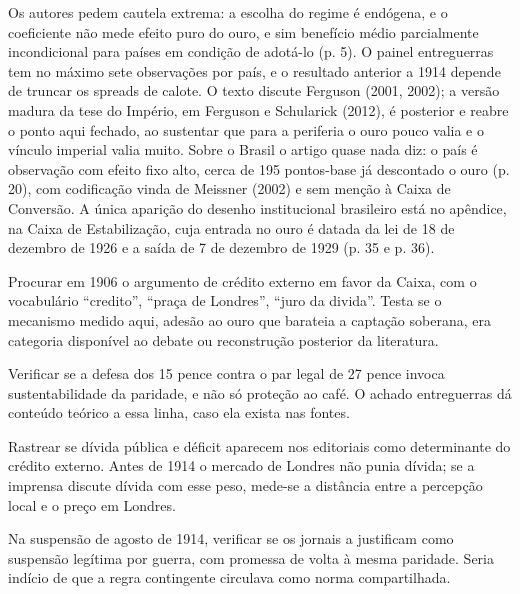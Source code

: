 Os autores pedem cautela extrema: a escolha do regime é endógena, e o
coeficiente não mede efeito puro do ouro, e sim benefício médio parcialmente
incondicional para países em condição de adotá-lo (p. 5). O painel entreguerras
tem no máximo sete observações por país, e o resultado anterior a 1914 depende
de truncar os spreads de calote. O texto discute Ferguson (2001, 2002); a versão
madura da tese do Império, em Ferguson e Schularick (2012), é posterior e reabre
o ponto aqui fechado, ao sustentar que para a periferia o ouro pouco valia e o
vínculo imperial valia muito. Sobre o Brasil o artigo quase nada diz: o país é
observação com efeito fixo alto, cerca de 195 pontos-base já descontado o ouro
(p. 20), com codificação vinda de Meissner (2002) e sem menção à Caixa de
Conversão. A única aparição do desenho institucional brasileiro está no
apêndice, na Caixa de Estabilização, cuja entrada no ouro é datada da lei de 18
de dezembro de 1926 e a saída de 7 de dezembro de 1929 (p. 35 e p. 36).

\begin{dialogo}
\item Procurar em 1906 o argumento de crédito externo em favor da Caixa, com o
vocabulário ``credito'', ``praça de Londres'', ``juro da divida''. Testa se o
mecanismo medido aqui, adesão ao ouro que barateia a captação soberana, era
categoria disponível ao debate ou reconstrução posterior da literatura.
\item Verificar se a defesa dos 15 pence contra o par legal de 27 pence invoca
sustentabilidade da paridade, e não só proteção ao café. O achado entreguerras
dá conteúdo teórico a essa linha, caso ela exista nas fontes.
\item Rastrear se dívida pública e déficit aparecem nos editoriais como
determinante do crédito externo. Antes de 1914 o mercado de Londres não punia
dívida; se a imprensa discute dívida com esse peso, mede-se a distância entre a
percepção local e o preço em Londres.
\item Na suspensão de agosto de 1914, verificar se os jornais a justificam como
suspensão legítima por guerra, com promessa de volta à mesma paridade. Seria
indício de que a regra contingente circulava como norma compartilhada.
\end{dialogo}

